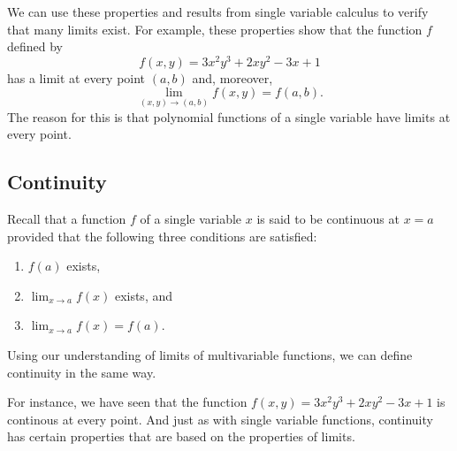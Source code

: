 We can use these properties and results from single variable calculus
to verify that many limits exist. For example, these properties show
that the function $f$ 
defined by 
$$
f(x,y) = 3x^2y^3 + 2xy^2 - 3x + 1
$$ 
has a limit at every point $(a,b)$ and, moreover, 
$$
\lim_{(x,y)\to(a,b)} f(x,y) = f(a,b).
$$
The reason for this is that polynomial functions of a single variable have limits at every point. 

\subsection*{Continuity}

Recall that a function $f$ of a single variable $x$ is said to be
continuous at 
$x=a$ provided that the following three conditions are satisfied: 
\begin{enumerate}
  \item $f(a)$ exists,
  \item $\lim_{x\to a}f(x)$ exists, and 
  \item $\lim_{x\to a}f(x)=f(a)$.
\end{enumerate}
Using our understanding of limits of multivariable functions, we can
define continuity in the same way. 

\vspace*{5pt}
\nin {}
\vspace*{5pt}

For instance, we have seen that the function $f(x,y) = 3x^2y^3 + 2xy^2
- 3x + 1$ is continous at every point.  And just as with single variable functions, continuity has certain
properties that are based on the properties of limits. 

